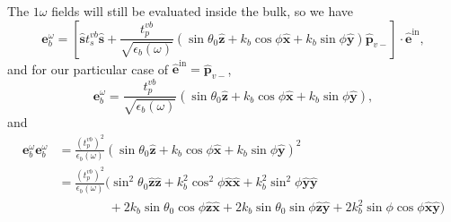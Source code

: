 The $1\omega$ fields will still be evaluated inside the bulk, so we have
\begin{equation*}
\mathbf{e}^{\omega}_{b}
= \left[
\hat{\mathbf{s}}t_{s}^{vb}\hat{\mathbf{s}}
+ \frac{t^{vb}_{p}}{\sqrt{\epsilon_{b}(\omega)}}
\left(
  \sin\theta_{0}\hat{\mathbf{z}}
+ k_{b}\cos\phi\hat{\mathbf{x}}
+ k_{b}\sin\phi\hat{\mathbf{y}}
\right) 
\hat{\mathbf{p}}_{v-}
\right]
\cdot\hat{\mathbf{e}}^{\mathrm{in}},  
\end{equation*}
and for our particular case of
$\hat{\mathbf{e}}^{\mathrm{in}}=\hat{\mathbf{p}}_{v-}$,
\begin{equation*}
\mathbf{e}^{\omega}_{b}
= \frac{t^{vb}_{p}}{\sqrt{\epsilon_{b}(\omega)}}
\left(
  \sin\theta_{0}\hat{\mathbf{z}}
+ k_{b}\cos\phi\hat{\mathbf{x}}
+ k_{b}\sin\phi\hat{\mathbf{y}}
\right),
\end{equation*}
and
\begin{equation*}
\begin{split}
\mathbf{e}^{\omega}_{b}\mathbf{e}^{\omega}_{b}
&= \frac{\left(t^{vb}_{p}\right)^{2}}{\epsilon_{b}(\omega)}
\left(
  \sin\theta_{0}\hat{\mathbf{z}}
+ k_{b}\cos\phi\hat{\mathbf{x}}
+ k_{b}\sin\phi\hat{\mathbf{y}}
\right)^{2}\\
&= \frac{\left(t^{vb}_{p}\right)^{2}}{\epsilon_{b}(\omega)}
\big(
  \sin^{2}\theta_{0}\hat{\mathbf{z}}\hat{\mathbf{z}}
+ k^{2}_{b}\cos^{2}\phi\hat{\mathbf{x}}\hat{\mathbf{x}}
+ k^{2}_{b}\sin^{2}\phi\hat{\mathbf{y}}\hat{\mathbf{y}}\\
&\qquad\qquad
+ 2k_{b}\sin\theta_{0}\cos\phi\hat{\mathbf{z}}\hat{\mathbf{x}}
+ 2k_{b}\sin\theta_{0}\sin\phi\hat{\mathbf{z}}\hat{\mathbf{y}}
+ 2k^{2}_{b}\sin\phi\cos\phi\hat{\mathbf{x}}\hat{\mathbf{y}}
\big)
\end{split}
\end{equation*}

